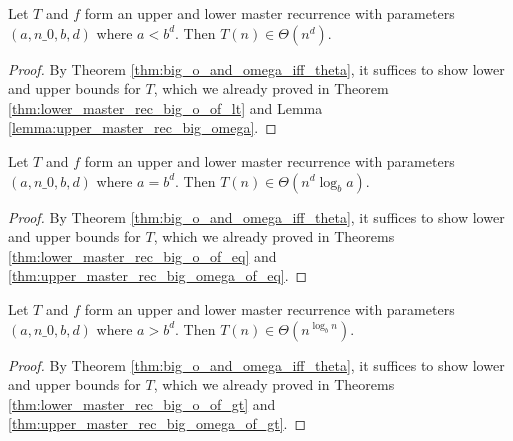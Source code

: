 \begin{corollary}
    \label{thm:master_rec_theta_of_lt}
    \leanok
    Let $T$ and $f$ form an upper and lower master recurrence with parameters 
    $(a, n\_0, b, d)$ where $a < b^d$. Then $T(n) \in \Theta(n^d)$.
\end{corollary}

\begin{proof}
    \leanok
    By Theorem \ref{thm:big_o_and_omega_iff_theta}, it suffices to show
    lower and upper bounds for $T$, which we already proved in Theorem
    \ref{thm:lower_master_rec_big_o_of_lt} and Lemma
    \ref{lemma:upper_master_rec_big_omega}.
\end{proof}

\begin{corollary}
    \label{thm:master_rec_theta_of_eq}
    \leanok
    Let $T$ and $f$ form an upper and lower master recurrence with parameters 
    $(a, n\_0, b, d)$ where $a = b^d$. Then $T(n) \in \Theta(n^d \log_b{a})$.
\end{corollary}

\begin{proof}
    \leanok
    By Theorem \ref{thm:big_o_and_omega_iff_theta}, it suffices to show
    lower and upper bounds for $T$, which we already proved in Theorems
    \ref{thm:lower_master_rec_big_o_of_eq} and 
    \ref{thm:upper_master_rec_big_omega_of_eq}.
\end{proof}

\begin{corollary}
    \label{thm:master_rec_theta_of_gt}
    \leanok
    Let $T$ and $f$ form an upper and lower master recurrence with parameters 
    $(a, n\_0, b, d)$ where $a > b^d$. Then $T(n) \in \Theta(n^{\log_b{n}})$.
\end{corollary}

\begin{proof}
    \leanok
    By Theorem \ref{thm:big_o_and_omega_iff_theta}, it suffices to show
    lower and upper bounds for $T$, which we already proved in Theorems
    \ref{thm:lower_master_rec_big_o_of_gt} and 
    \ref{thm:upper_master_rec_big_omega_of_gt}.
\end{proof}
